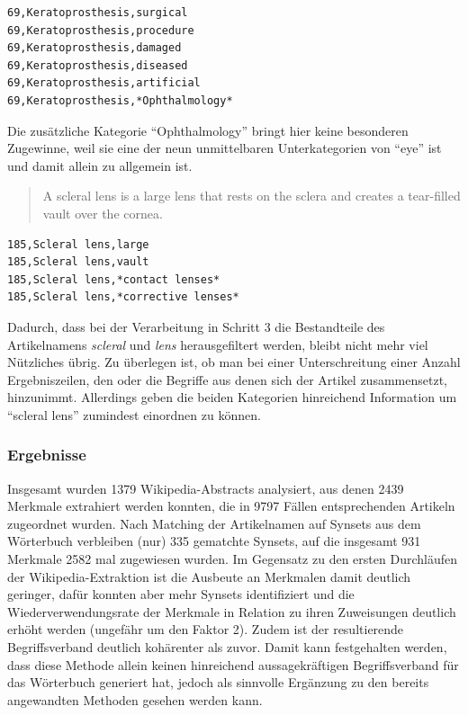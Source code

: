 \documentclass[pagesize,DIV=calc,12pt,final]{scrreprt}
\begin{document}
\begin{lstlisting}
69,Keratoprosthesis,surgical 
69,Keratoprosthesis,procedure
69,Keratoprosthesis,damaged 
69,Keratoprosthesis,diseased
69,Keratoprosthesis,artificial 
69,Keratoprosthesis,*Ophthalmology*
\end{lstlisting}

Die zusätzliche Kategorie \enquote{Ophthalmology} bringt hier keine besonderen Zugewinne, weil sie eine der neun unmittelbaren Unterkategorien von \enquote{eye} ist und damit allein zu allgemein ist.

\begin{quote}
A scleral lens is a large lens that rests on the sclera and creates a tear-filled vault over the cornea.
\end{quote}

\lstset{
	numbers=left,
        language=Bash,
	basicstyle=\ttfamily\footnotesize,
	extendedchars=true,
	inputencoding=utf8,
	breaklines=true,
	breakindent=0pt,
}

\begin{lstlisting}
185,Scleral lens,large 
185,Scleral lens,vault 
185,Scleral lens,*contact lenses* 
185,Scleral lens,*corrective lenses*
\end{lstlisting}

Dadurch, dass bei der Verarbeitung in Schritt 3 die Bestandteile des Artikelnamens \textit{scleral} und \textit{lens} herausgefiltert werden, bleibt nicht mehr viel Nützliches übrig. 
Zu überlegen ist, ob man bei einer Unterschreitung einer Anzahl Ergebniszeilen, den oder die Begriffe aus denen sich der Artikel zusammensetzt, hinzunimmt. 
Allerdings geben die beiden Kategorien hinreichend Information um \enquote{scleral lens} zumindest einordnen zu können. 

\subsubsection{Ergebnisse}

Insgesamt wurden 1379 Wikipedia-Abstracts analysiert, aus denen 2439 Merkmale extrahiert werden konnten, die in 9797 Fällen entsprechenden Artikeln zugeordnet wurden. 
Nach Matching der Artikelnamen auf Synsets aus dem Wörterbuch verbleiben (nur) 335 gematchte Synsets, auf die insgesamt 931 Merkmale 2582 mal zugewiesen wurden. 
Im Gegensatz zu den ersten Durchläufen der Wikipedia-Extraktion ist die Ausbeute an Merkmalen damit deutlich geringer, dafür konnten aber mehr Synsets identifiziert und die Wiederverwendungsrate der Merkmale in Relation zu ihren Zuweisungen deutlich erhöht werden (ungefähr um den Faktor 2). 
Zudem ist der resultierende Begriffsverband deutlich kohärenter als zuvor. 
Damit kann festgehalten werden, dass diese Methode allein keinen hinreichend aussagekräftigen Begriffsverband für das Wörterbuch generiert hat, jedoch als sinnvolle Ergänzung zu den bereits angewandten Methoden gesehen werden kann. 
\end{document}
